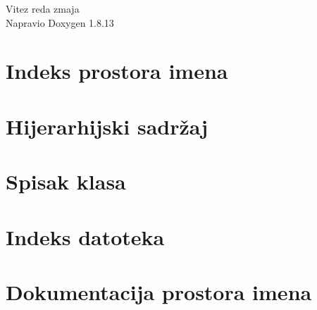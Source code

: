 \documentclass[twoside]{book}
\newcommand{\+}{\discretionary{\mbox{\scriptsize$\hookleftarrow$}}{}{}}
\newcommand{\clearemptydoublepage}{%
  \newpage{\pagestyle{empty}\cleardoublepage}%
}
\begin{document}
\hypersetup{pageanchor=false,
             bookmarksnumbered=true,
             pdfencoding=unicode
            }
\begin{titlepage}
\vspace*{7cm}
\begin{center}%
{\Large Vitez reda zmaja }\\
\vspace*{1cm}
{\large Napravio Doxygen 1.8.13}\\
\end{center}
\end{titlepage}
\clearemptydoublepage
{}
\tableofcontents
\clearemptydoublepage
{}
\hypersetup{pageanchor=true}

\chapter{Indeks prostora imena}

\chapter{Hijerarhijski sadržaj}

\chapter{Spisak klasa}

\chapter{Indeks datoteka}

\chapter{Dokumentacija prostora imena}











\end{document}
